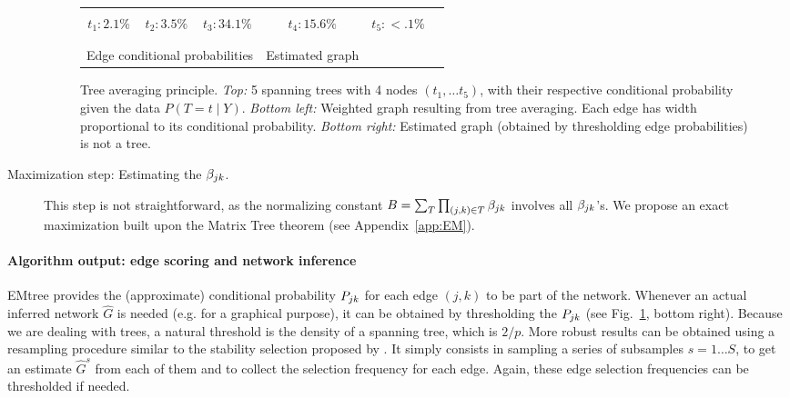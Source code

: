 \begin{description}
\begin{figure}%
   \begin{center}
    \begin{tabular}{cccccc}
         &
         &
         &
         &
         \\
        $t_1: 2.1\%$ & 
        $t_2: 3.5\%$ & 
        $t_3: 34.1\%$ & 
        $t_4: 15.6\%$ & 
        $t_5:  <.1\%$ \\ \\
        & 
         &
        \qquad \qquad &
         \\
        \multicolumn{3}{c}{Edge conditional probabilities} & Estimated graph \\
    \end{tabular}
    \caption{Tree averaging principle. 
    \textit{Top:} 5 spanning trees with 4 nodes  $(t_1, \dots t_5)$, with their respective conditional probability given the data $P(T = t \mid Y)$.
    \textit{Bottom left:} Weighted graph resulting from tree averaging. Each edge  has width proportional to its conditional probability. \textit{ Bottom right:} Estimated graph (obtained by thresholding edge probabilities) is not a tree.}
    \label{fig:treeaveraging}
   \end{center}
\end{figure}

\item[Maximization step: Estimating the $\beta_{jk}$.] 
This step is not straightforward, as the normalizing constant $B = \sum_T \prod_{(j, k) \in T} \beta_{jk}$ involves all $\beta_{jk}$'s. We propose an exact maximization built upon the Matrix Tree theorem (see Appendix~\ref{app:EM}). 
\end{description}


\paragraph{Algorithm output: edge scoring and network inference} 
EMtree provides the (approximate) conditional probability $P_{jk}$ for each edge $(j, k)$ to be part of the network. 
Whenever an actual inferred network $\widehat{G}$ is needed (e.g. for a graphical purpose), it can be obtained by thresholding the $P_{jk}$ (see Fig.~\ref{fig:treeaveraging}, bottom right). Because we are dealing with trees, a natural threshold is the density of a spanning tree, which is  $2/p$.
More robust results can be obtained using a resampling procedure similar to the stability selection proposed by \citet{LRW10}. It simply consists in sampling a series of subsamples $s = 1 \dots S$, to get an estimate $\widehat{G}^s$ from each of them and to collect the selection frequency for each edge. Again, these edge selection frequencies can be thresholded if needed.
